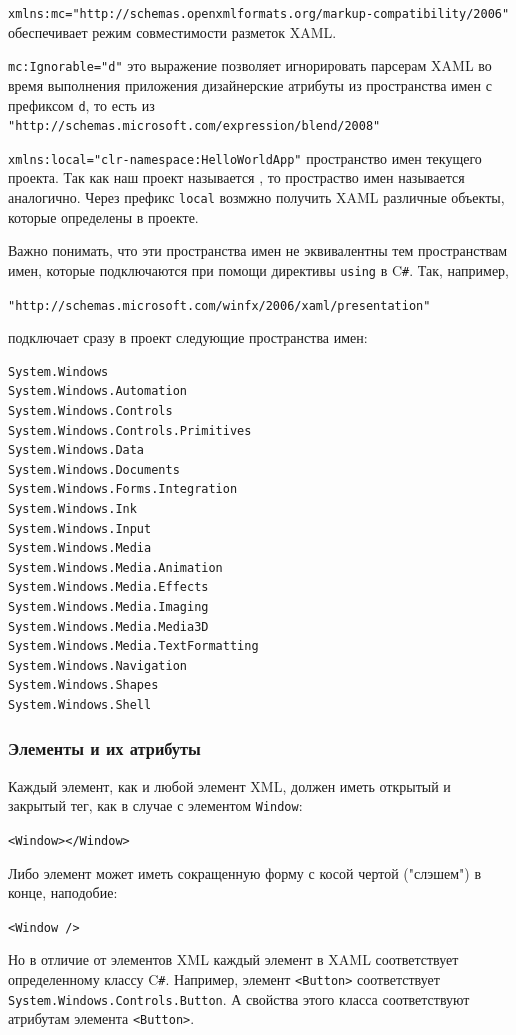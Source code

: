 \texttt{xmlns:mc="http://schemas.openxmlformats.org/markup-compatibility/2006"} обеспечивает режим совместимости разметок XAML.

\texttt{mc:Ignorable="d"} это выражение позволяет игнорировать парсерам XAML во время выполнения приложения дизайнерские атрибуты из пространства имен с префиксом \texttt{d}, то есть из \texttt{"http://schemas.microsoft.com/expression/blend/2008"}

\texttt{xmlns:local="clr-namespace:HelloWorldApp"} пространство имен текущего проекта. Так как наш проект называется , то простраство имен называется аналогично. Через префикс \texttt{local} возмжно получить XAML различные объекты, которые определены в проекте.

Важно понимать, что эти пространства имен не эквивалентны тем пространствам имен, которые подключаются при помощи директивы \texttt{using} в C\texttt{\#}. Так, например,

\texttt{"http://schemas.microsoft.com/winfx/2006/xaml/presentation"} 

подключает сразу в проект следующие пространства имен:

\begin{verbatim}
System.Windows
System.Windows.Automation
System.Windows.Controls
System.Windows.Controls.Primitives
System.Windows.Data
System.Windows.Documents
System.Windows.Forms.Integration
System.Windows.Ink
System.Windows.Input
System.Windows.Media
System.Windows.Media.Animation
System.Windows.Media.Effects
System.Windows.Media.Imaging
System.Windows.Media.Media3D
System.Windows.Media.TextFormatting
System.Windows.Navigation
System.Windows.Shapes
System.Windows.Shell
\end{verbatim}

\subsubsection{Элементы и их атрибуты}
Каждый элемент, как и любой элемент XML, должен иметь открытый и закрытый тег, как в случае с элементом \texttt{Window}:

\texttt{<Window></Window>}

Либо элемент может иметь сокращенную форму с косой чертой ("слэшем") в конце, наподобие:

\texttt{<Window />}

Но в отличие от элементов XML каждый элемент в XAML соответствует определенному классу C\texttt{\#}. Например, элемент \texttt{<Button>} соответствует \texttt{System.Windows.Controls.Button}. А свойства этого класса соответствуют атрибутам элемента \texttt{<Button>}.

